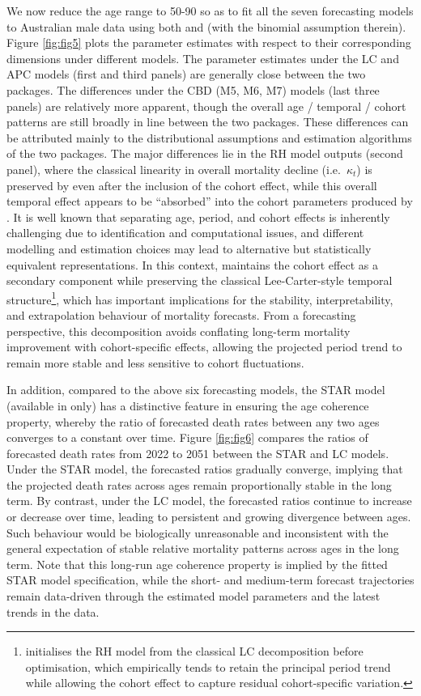 We now reduce the age range to 50-90 so as to fit all the seven forecasting models to Australian male data using both  and  (with the binomial assumption therein). Figure \ref{fig:fig5} plots the parameter estimates with respect to their corresponding dimensions under different models. The parameter estimates under the LC and APC models (first and third panels) are generally close between the two packages. The differences under the CBD (M5, M6, M7) models (last three panels) are relatively more apparent, though the overall age / temporal / cohort patterns are still broadly in line between the two packages. These differences can be attributed mainly to the distributional assumptions and estimation algorithms of the two packages. The major differences lie in the RH model outputs (second panel), where the classical linearity in overall mortality decline (i.e.~\(\kappa_t\)) is preserved by  even after the inclusion of the cohort effect, while this overall temporal effect appears to be ``absorbed'' into the cohort parameters produced by . It is well known that separating age, period, and cohort effects is inherently challenging due to identification and computational issues, and different modelling and estimation choices may lead to alternative but statistically equivalent representations. In this context,  maintains the cohort effect as a secondary component while preserving the classical Lee-Carter-style temporal structure\footnote{ initialises the RH model from the classical LC decomposition before optimisation, which empirically tends to retain the principal period trend while allowing the cohort effect to capture residual cohort-specific variation.}, which has important implications for the stability, interpretability, and extrapolation behaviour of mortality forecasts. From a forecasting perspective, this decomposition avoids conflating long-term mortality improvement with cohort-specific effects, allowing the projected period trend to remain more stable and less sensitive to cohort fluctuations.

In addition, compared to the above six forecasting models, the STAR model (available in  only) has a distinctive feature in ensuring the age coherence property, whereby the ratio of forecasted death rates between any two ages converges to a constant over time. Figure \ref{fig:fig6} compares the ratios of forecasted death rates from 2022 to 2051 between the STAR and LC models. Under the STAR model, the forecasted ratios gradually converge, implying that the projected death rates across ages remain proportionally stable in the long term. By contrast, under the LC model, the forecasted ratios continue to increase or decrease over time, leading to persistent and growing divergence between ages. Such behaviour would be biologically unreasonable and inconsistent with the general expectation of stable relative mortality patterns across ages in the long term. Note that this long-run age coherence property is implied by the fitted STAR model specification, while the short- and medium-term forecast trajectories remain data-driven through the estimated model parameters and the latest trends in the data.

